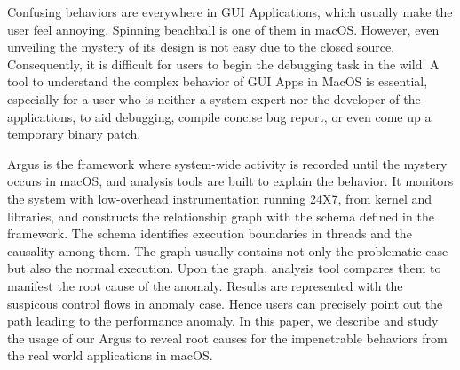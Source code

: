 Confusing behaviors are everywhere in GUI Applications, which usually make the user feel annoying.
Spinning beachball is one of them in macOS.
However, even unveiling the mystery of its design is not easy due to the closed source.
Consequently, it is difficult for users to begin the debugging task in the wild.
A tool to understand the complex behavior of GUI Apps in MacOS is essential, especially for a user who is neither a system expert nor the developer of the applications, to aid debugging, compile concise bug report, or even come up a temporary binary patch.

Argus is the framework where system-wide activity is recorded until the mystery occurs in macOS, and analysis tools are built to explain the behavior.
It monitors the system with low-overhead instrumentation running 24X7, from kernel and libraries, and constructs the relationship graph with the schema defined in the framework.
The schema identifies execution boundaries in threads and the causality among them.
The graph usually contains not only the problematic case but also the normal execution.
Upon the graph, analysis tool compares them to manifest the root cause of the anomaly.
Results are represented with the suspicous control flows in anomaly case.
Hence users can precisely point out the path leading to the performance anomaly.
In this paper, we describe and study the usage of our Argus to reveal root causes for the impenetrable behaviors from the real world applications in macOS.
